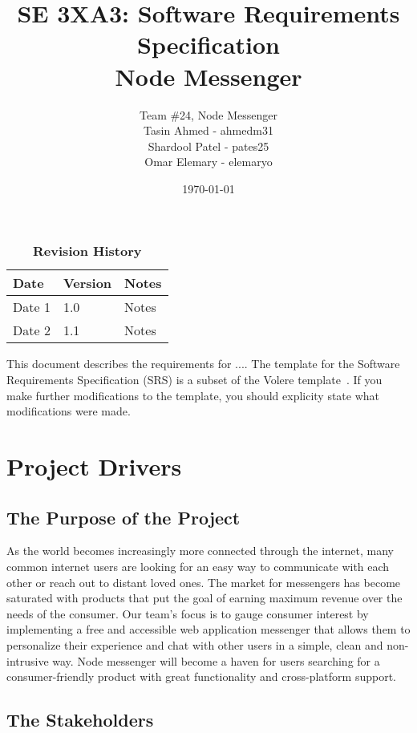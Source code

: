 \documentclass[12pt, titlepage]{article}
\title{SE 3XA3: Software Requirements Specification\\Node Messenger}
\author{Team \#24, Node Messenger
		\\ Tasin Ahmed - ahmedm31
		\\ Shardool Patel - pates25
		\\ Omar Elemary - elemaryo
}
\date{\today}
\begin{document}
    \maketitle

    \tableofcontents
    \listoftables
    \listoffigures

    \begin{table}[bp]
    \caption{\bf Revision History}
    \begin{tabularx}{\textwidth}{p{3cm}p{2cm}X}
    \toprule {\bf Date} & {\bf Version} & {\bf Notes}\\
    \midrule
    Date 1 & 1.0 & Notes\\
    Date 2 & 1.1 & Notes\\
    \bottomrule
    \end{tabularx}
    \end{table}

    \newpage


    This document describes the requirements for ....  The template for the Software
    Requirements Specification (SRS) is a subset of the Volere
    template~\citep{RobertsonAndRobertson2012}.  If you make further modifications
    to the template, you should explicity state what modifications were made.

    \section{Project Drivers}

    	\subsection{The Purpose of the Project}
        As the world becomes increasingly more connected through the internet, many common internet users are looking for an easy way to communicate with each other or reach out to distant loved ones. The market for messengers has become saturated with products that put the goal of earning maximum revenue over the needs of the consumer. Our team’s focus is to gauge consumer interest by implementing a free and accessible web application messenger that allows them to personalize their experience and chat with other users in a simple, clean and non-intrusive way. Node messenger will become a haven for users searching for a consumer-friendly product with great functionality and cross-platform support.
    	\subsection{The Stakeholders}
\end{document}

